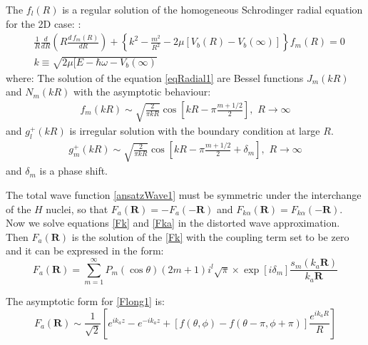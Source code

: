 The $ f_l(R) $ is a regular solution of the homogeneous Schrodinger radial  equation for the 2D case: \cite{H2atom}:
\begin{equation}\label{eqRadial1}
\begin{split}
& \frac{1}{R}\frac{d}{dR}\left(R \frac{d\,f_m(R)}{dR}\right) + \left\{k^2 - \frac{m^2}{R^2} - 2\mu\left[V_b(R) - V_b(\infty)\right] \right\}f_m(R) = 0 \\[.8em]
& k \equiv \sqrt{2\mu[E - \hbar\omega - V_b(\infty)}
\end{split}
\end{equation}
where:
The solution of the equation \eqref{eqRadial1} are Bessel functions $ J_m(kR) $ and $ N_m(kR) $ with the asymptotic behaviour:
\begin{equation}
\begin{split}
f_{m}(kR)\sim \sqrt{\frac{2}{\pi kR}}\cos\left[kR - \pi\frac{m+1/2}{2} \right],\,\,{R \rightarrow \infty}
\end{split}
\end{equation}
and $ g^{+}_l(kR) $ is irregular solution with the boundary condition at large $ R $.
\begin{equation}
\begin{split}
g^{+}_{m}{(kR)} \sim \sqrt{\frac{2}{\pi kR}}\cos\left[kR - \pi\frac{m+1/2}{2} + \delta_m\right],\,\,{R \rightarrow \infty}
\end{split}
\end{equation}
and $  \delta_m $ is a phase shift. 

The total wave function \eqref{ansatzWave1} must be symmetric under the interchange of the $ H $ nuclei, so that $ F_a(\mathbf{R}) = -F_a(-\mathbf{R}) $ and $ F_{k\alpha}(\mathbf{R}) =  F_{k\alpha}(-\mathbf{R}) $. Now we solve equations \eqref{Fk} and \eqref{Fka} in the distorted wave approximation. Then $ F_a(\mathbf{R}) $ is the solution of the \eqref{Fk} with the coupling term set to be zero and it can be expressed in the form:
\begin{equation}\label{Flong1}
F_a(\mathbf{R}) = \sum_{m=1}^{\infty}{P_m(\cos\theta)(2m+1)i^{l}\sqrt{\pi}\times \exp[i\delta_m]\frac{s_m(k_a\mathbf{R})}{k_a\mathbf{R} } } 
\end{equation}

The asymptotic form for \eqref{Flong1} is:
\begin{equation}\label{FlongA}
F_a(\mathbf{R}) \sim \frac{1}{\sqrt{2}}\left[e^{ik_az}-e^{-ik_az} + [f(\theta,\phi) - f(\theta-\pi,\phi+\pi)]\frac{e^{ik_aR}}{R}\right]
\end{equation}

